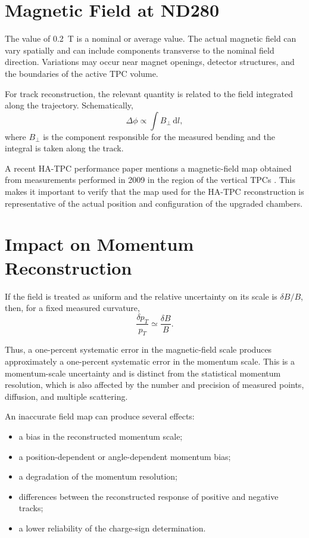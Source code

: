 \section{Magnetic Field at ND280}

The value of \SI{0.2}{T} is a nominal or average value. The actual magnetic field can vary spatially and can include components transverse to the nominal field direction. Variations may occur near magnet openings, detector structures, and the boundaries of the active TPC volume.

For track reconstruction, the relevant quantity is related to the field integrated along the trajectory. Schematically,
\begin{equation}
 \Delta\phi \propto \int B_{\perp}\,\mathrm{d}l,
 \label{eq:integral}
\end{equation}
where $B_{\perp}$ is the component responsible for the measured bending and the integral is taken along the track.

A recent HA-TPC performance paper mentions a magnetic-field map obtained from measurements performed in 2009 in the region of the vertical TPCs \cite{HATPCPerformance}. This makes it important to verify that the map used for the HA-TPC reconstruction is representative of the actual position and configuration of the upgraded chambers.

\section{Impact on Momentum Reconstruction}

If the field is treated as uniform and the relative uncertainty on its scale is $\delta B/B$, then, for a fixed measured curvature,
\begin{equation}
 \frac{\delta p_T}{p_T} \simeq \frac{\delta B}{B}.
 \label{eq:scale}
\end{equation}

Thus, a one-percent systematic error in the magnetic-field scale produces approximately a one-percent systematic error in the momentum scale. This is a momentum-scale uncertainty and is distinct from the statistical momentum resolution, which is also affected by the number and precision of measured points, diffusion, and multiple scattering.

An inaccurate field map can produce several effects:
\begin{itemize}[leftmargin=*]
  \item a bias in the reconstructed momentum scale;
  \item a position-dependent or angle-dependent momentum bias;
  \item a degradation of the momentum resolution;
  \item differences between the reconstructed response of positive and negative tracks;
  \item a lower reliability of the charge-sign determination.
\end{itemize}

